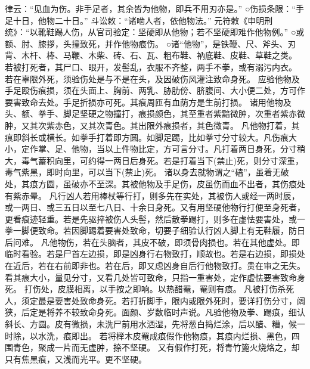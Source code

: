 \documentclass[12pt,UTF8]{ctexbook}
\begin{document}
律云：“见血为伤。非手足者，其余皆为他物，即兵不用刃亦是。”
○伤损条限：“手足十日，他物二十日。”
斗讼敕：“诸啮人者，依他物法。”
元符敕《申明刑统》：“以靴鞋踢人伤，从官司验定：坚硬即从他物；若不坚硬即难作他物例。”
○或额、肘、膝拶，头撞致死，并作他物痕伤。
○诸“他物”，是铁鞭、尺、斧头、刃背、木杆、棒、马鞭、木柴、砖、石、瓦、粗布鞋、衲底鞋、皮鞋、草鞋之类。
若被打死者，其尸口、眼开，发髻乱，衣服不齐整，两手不拳，或有溺污内衣。
若在辜限外死，须验伤处是与不是在头，及因破伤风灌注致命身死。
应验他物及手足殴伤痕损，须在头面上、胸前、两乳、胁肋傍、脐腹间、大小便二处，方可作要害致命去处。手足折损亦可死。其痕周匝有血荫方是生前打损。
诸用他物及头、额、拳手、脚足坚硬之物撞打，痕损颜色，其至重者紫黯微肿，次重者紫赤微肿，又其次紫赤色，又其次青色。其出限外痕损者，其色微青。
凡他物打着，其痕即斜长或横长。如拳手打着即方圆。如脚足踢，比如拳寸分寸较大。凡伤痕大小，定作掌、足、他物，当以上件物比定，方可言分寸。凡打着两日身死，分寸稍大，毒气蓄积向里，可约得一两日后身死。若是打着当下(禁止)死，则分寸深重，毒气紫黑，即时向里，可以当下(禁止)死。
诸以身去就物谓之“磕”，虽着无破处，其痕方圆，虽破亦不至深。其被他物及手足伤，皮虽伤而血不出者，其伤痕处有紫赤晕。
凡行凶人若用棒杖等行打，则多先在实处，其被伤人或经一两时辰，或一两日、或三五日以至七八日、十余日身死。又有用坚硬他物行打便至身死者，更看痕迹轻重。若是先驱捽被伤人头髻，然后散拳踢打，则多在虚怯要害处，或一拳一脚便致命。若因脚踢着要害处致命，切要子细验认行凶人脚上有无鞋履，防日后问难。
凡他物伤，若在头脑者，其皮不破，即须骨肉损也。若在其他虚处。即临时看验。若是尸首左边损，即是凶身行右物致打，顺故也。若是右边损，即损处在近后，若在右前即非也。若在后，即又虑凶身自后行他物致打。贵在审之无失。
看其痕大小，量见分寸，又看几处皆可致命，只指一重害处，定作虚怯要害致命身死。
打伤处，皮膜相离，以手按之即响。以热醋罨，罨则有痕。
凡被打伤杀死人，须定最是要害处致命身死。若打折脚手，限内或限外死时，要详打伤分寸，阔狭，后定是将养不较致命身死。面颜、岁数临时声说。凡验他物及拳、踢痕，细认斜长、方圆。皮有微损，未洗尸前用水洒湿，先将葱白捣烂涂，后以醋、糟，候一时除，以水洗，痕即出。
若将榉木皮罨成痕假作他物痕，其痕内烂损、黑色，四围青色，聚成一片而无虚肿，捺不坚硬。
又有假作打死，将青竹篦火烧烙之，却只有焦黑痕，又浅而光平。更不坚硬。
\end{document}
